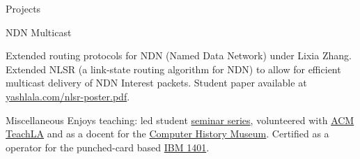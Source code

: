 \documentclass{resume} %
\begin{document}
\begin{resumeSection}{Projects}

\begin{resumeSubsection}{NDN Multicast}{}{}{}
\item Extended routing protocols for NDN (Named Data Network) under Lixia Zhang. 
	Extended NLSR (a link-state routing algorithm for NDN) to allow for
	efficient multicast delivery of NDN Interest packets. 
	Student paper available at 
	\href{https://yashlala.com/nlsr-poster.pdf}{yashlala.com/nlsr-poster.pdf}. 
\end{resumeSubsection}

\end{resumeSection}

\begin{resumeSection}{Miscellaneous}
	Enjoys teaching: led student 
	\href{https://yashlala.com/binary-search-club/}{seminar series}, 
	volunteered with \href{https://teachla.uclaacm.com/}{ACM
	TeachLA} and as a docent for the 
	\href{https://computerhistory.org/}{Computer History Museum}. 
	Certified as a operator for the punched-card based \href{https://en.wikipedia.org/wiki/IBM_1401}{IBM 1401}.
\end{resumeSection}
\end{document}
